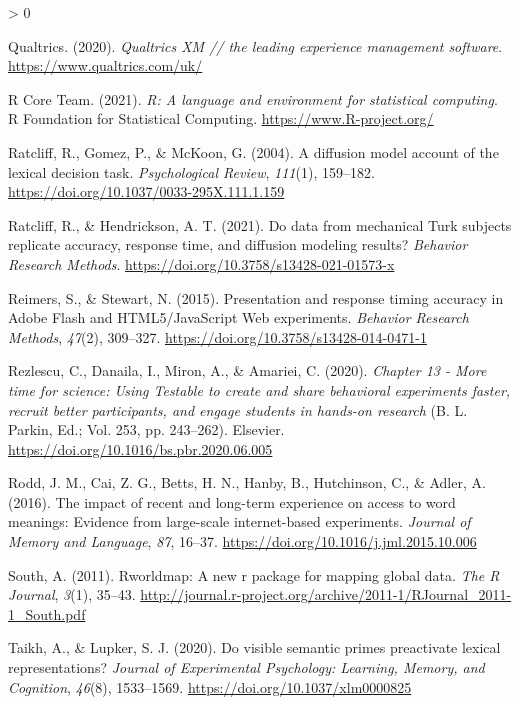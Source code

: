 \documentclass[
  english,
  man,floatsintext]{apa6}
\newlength{\cslhangindent}
\newenvironment{CSLReferences}[2] %
 {%
  \setlength{\parindent}{0pt}
  \ifodd #1 \everypar{\setlength{\hangindent}{\cslhangindent}}\ignorespaces\fi
  \ifnum #2 > 0
  \setlength{\parskip}{#2\baselineskip}
  \fi
 }%
 {}
\begin{document}
\begin{CSLReferences}{1}{0}
\leavevmode\hypertarget{ref-qualtrics2020}{}%
Qualtrics. (2020). \emph{Qualtrics XM // the leading experience management software}. \url{https://www.qualtrics.com/uk/}

\leavevmode\hypertarget{ref-R-base}{}%
R Core Team. (2021). \emph{R: A language and environment for statistical computing}. R Foundation for Statistical Computing. \url{https://www.R-project.org/}

\leavevmode\hypertarget{ref-ratcliff2004}{}%
Ratcliff, R., Gomez, P., \& McKoon, G. (2004). A diffusion model account of the lexical decision task. \emph{Psychological Review}, \emph{111}(1), 159--182. \url{https://doi.org/10.1037/0033-295X.111.1.159}

\leavevmode\hypertarget{ref-ratcliff2021}{}%
Ratcliff, R., \& Hendrickson, A. T. (2021). Do data from mechanical Turk subjects replicate accuracy, response time, and diffusion modeling results? \emph{Behavior Research Methods}. \url{https://doi.org/10.3758/s13428-021-01573-x}

\leavevmode\hypertarget{ref-reimersPresentationResponseTiming2015}{}%
Reimers, S., \& Stewart, N. (2015). Presentation and response timing accuracy in {Adobe Flash} and {HTML5}/{JavaScript Web} experiments. \emph{Behavior Research Methods}, \emph{47}(2), 309--327. \url{https://doi.org/10.3758/s13428-014-0471-1}

\leavevmode\hypertarget{ref-rezlescu2020}{}%
Rezlescu, C., Danaila, I., Miron, A., \& Amariei, C. (2020). \emph{Chapter 13 - More time for science: Using Testable to create and share behavioral experiments faster, recruit better participants, and engage students in hands-on research} (B. L. Parkin, Ed.; Vol. 253, pp. 243--262). Elsevier. \url{https://doi.org/10.1016/bs.pbr.2020.06.005}

\leavevmode\hypertarget{ref-rodd2016impact}{}%
Rodd, J. M., Cai, Z. G., Betts, H. N., Hanby, B., Hutchinson, C., \& Adler, A. (2016). The impact of recent and long-term experience on access to word meanings: Evidence from large-scale internet-based experiments. \emph{Journal of Memory and Language}, \emph{87}, 16--37. \url{https://doi.org/10.1016/j.jml.2015.10.006}

\leavevmode\hypertarget{ref-R-rworldmap}{}%
South, A. (2011). Rworldmap: A new r package for mapping global data. \emph{The R Journal}, \emph{3}(1), 35--43. \url{http://journal.r-project.org/archive/2011-1/RJournal_2011-1_South.pdf}

\leavevmode\hypertarget{ref-Taikh_2020}{}%
Taikh, A., \& Lupker, S. J. (2020). Do visible semantic primes preactivate lexical representations? \emph{Journal of Experimental Psychology: Learning, Memory, and Cognition}, \emph{46}(8), 1533--1569. \url{https://doi.org/10.1037/xlm0000825}


\end{CSLReferences}
\end{document}

